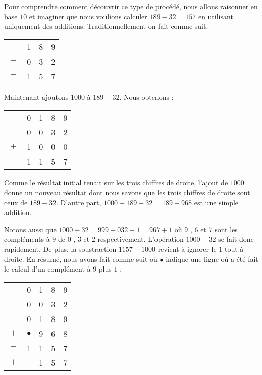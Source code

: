 Pour comprendre comment découvrir ce type de procédé, nous allons raisonner en base $10$ et imaginer que nous voulions calculer $189 - 32 = 157$ en utilisant uniquement des additions. Traditionnellement on fait comme suit.
\begin{center}
\begin{tabular}{cccc}
	    & 1 & 8 & 9 \\
	$-$ & 0 & 3 & 2 \\
	\hline
    $=$ & 1 & 5 & 7 \\
\end{tabular}
\end{center}
Maintenant ajoutons $1000$ à $189 - 32$. Nous obtenons :
\begin{center}
\begin{tabular}{ccccc}
	    & 0 & 1 & 8 & 9 \\
	$-$ & 0 & 0 & 3 & 2 \\
	$+$ & 1 & 0 & 0 & 0 \\
	\hline
    $=$ & 1 & 1 & 5 & 7 \\
\end{tabular}
\end{center}
Comme le résultat initial tenait sur les trois chiffres de droite, l'ajout de $1000$ donne un nouveau résultat dont nous savons que les trois chiffres de droite sont ceux de $189 - 32$.
D'autre part, $1000 + 189 - 32 = 189 + 968$ est une simple addition.

\smallskip

Notons aussi que $1000 - 32 = 999 - 032 + 1 = 967 + 1$ où $9$ , $6$ et $7$ sont les compléments à $9$ de $0$ , $3$ et $2$ respectivement.
L'opération $1000 - 32$ se fait donc rapidement. De plus, la soustraction $1157 - 1000$ revient à ignorer le $1$ tout à droite. En résumé, nous avons fait comme suit où $\bullet$ indique une ligne où a été fait le calcul d'un complément à $9$ plus $1$ :

\begin{center}
\begin{tabular}{ccccc}
	    & 0 & 1 & 8 & 9 \\
	$-$ & 0 & 0 & 3 & 2 \\
	\hline
	\hline
	    & 0 & 1 & 8 & 9 \\
	$+$ & $\bullet$ & 9 & 6 & 8 \\
	\hline
    $=$ & 1 & 1 & 5 & 7 \\
	\hline
	\hline
    $+$ &  & 1 & 5 & 7 \\
\end{tabular}
\end{center}

